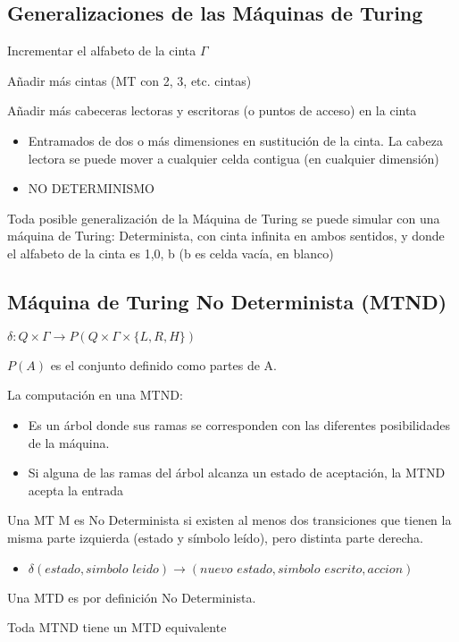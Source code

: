 \subsection{Generalizaciones de las Máquinas de Turing}
Incrementar el alfabeto de la cinta $\Gamma$

Añadir más cintas (MT con 2, 3, etc. cintas)

Añadir más cabeceras lectoras y escritoras (o puntos de acceso) en la cinta
\begin{itemize}
    \item Entramados de dos o más dimensiones en sustitución de la cinta. La cabeza lectora se puede mover a cualquier celda contigua (en cualquier dimensión)
    \item NO DETERMINISMO
\end{itemize}

Toda posible generalización de la Máquina de Turing se puede simular con una máquina de Turing: Determinista, con cinta infinita en ambos sentidos, y donde el alfabeto de la cinta es {1,0, b} (b es celda vacía, en blanco)

\subsection{Máquina de Turing No Determinista (MTND)}
$\delta: Q \times \Gamma \rightarrow P(Q\times \Gamma \times \{L, R, H\})$

$P(A)$ es el conjunto definido como partes de A.

La computación en una MTND:
\begin{itemize}
    \item Es un árbol donde sus ramas se corresponden con las diferentes posibilidades de la máquina.
    \item Si alguna de las ramas del árbol alcanza un estado de aceptación, la MTND acepta la entrada
\end{itemize}

Una MT M es No Determinista si existen al menos dos transiciones que tienen la misma parte izquierda (estado y símbolo leído), pero distinta parte derecha. 
\begin{itemize}
    \item $\delta(\textit{estado},\textit{simbolo leido})\rightarrow (\textit{nuevo estado},\textit{simbolo escrito},\textit{accion})$
\end{itemize}

Una MTD es por definición No Determinista.

Toda MTND tiene un MTD equivalente


